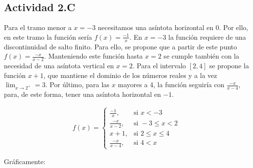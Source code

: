 \subsection*{Actividad 2.C}

Para el tramo menor a $x = -3$ necesitamos una asíntota horizontal en 0. Por ello, en este tramo la función sería $f(x) = \frac{-1}{x}$.
En $x = -3$ la función requiere de una discontinuidad de salto finito. Para ello, se propone que a partir de este punto $f(x) = \frac{-x}{x-2}$.
Manteniendo este función hasta $x = 2$ se cumple también con la necesidad de una asíntota vertical en $x = 2$.
Para el intervalo $[2, 4]$ se propone la función $x+1$, que mantiene el dominio de los números reales y a la vez $\lim_{x \to 2^+} = 3$.
Por último, para las $x$ mayores a 4, la función seguiría con $\frac{-x}{x-4}$, para, de este forma, tener una asíntota horizontal en $-1$.

\begin{align*}
    f(x) =
    \begin{cases}
        \frac{-1}{x},   & \text{si } x < -3          \\
        \frac{-x}{x-2}, & \text{si } -3 \leq x < 2   \\
        x+1,            & \text{si } 2 \leq x \leq 4 \\
        \frac{-x}{x-4}, & \text{si } 4 < x
    \end{cases}
\end{align*}

Gráficamente:

\begin{center}
\end{center}
